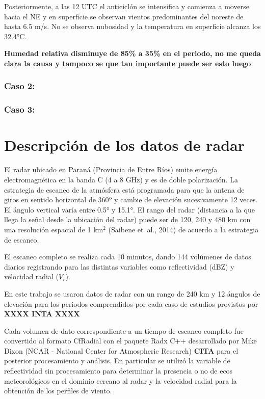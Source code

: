 \documentclass[12pt,spanish,oneside]{book}
\begin{document}
Posteriormente, a las 12 UTC el anticiclón se intensifica y comienza a
moverse hacia el NE y en superficie se observan vientos predominantes
del noreste de hasta 6.5 m/s. No se observa nubosidad y la temperatura
en superficie alcanza los 32.4°C.

\textbf{Humedad relativa disminuye de 85\% a 35\% en el periodo, no me
queda clara la causa y tampoco se que tan importante puede ser esto
luego}

\subsubsection{Caso 2:}\label{caso-2}

\subsubsection{Caso 3:}\label{caso-3}

\section{Descripción de los datos de
radar}\label{descripcion-de-los-datos-de-radar}

El radar ubicado en Paraná (Provincia de Entre Ríos) emite energía
electromagnética en la banda C (4 a 8 GHz) y es de doble polarización.
La estrategia de escaneo de la atmósfera está programada para que la
antena de giros en sentido horizontal de 360º y cambie de elevación
sucesivamente 12 veces. El ángulo vertical varía entre 0.5° y 15.1°. El
rango del radar (distancia a la que llega la señal desde la ubicación
del radar) puede ser de 120, 240 y 480 km con una resolución espacial de
1 \(\mathrm{km^2}\) (Saibene et~al., 2014) de acuerdo a la estrategia de
escaneo.

El escaneo completo se realiza cada 10 minutos, dando 144 volúmenes de
datos diarios registrando para las distintas variables como
reflectividad (dBZ) y velocidad radial (\(V_r\)).

En este trabajo se usaron datos de radar con un rango de 240 km y 12
ángulos de elevación para los periodos comprendidos por cada caso de
estudios provistos por \textbf{XXXX INTA XXXX}

Cada volumen de dato correspondiente a un tiempo de escaneo completo fue
convertido al formato CfRadial con el paquete Radx C++ desarrollado por
Mike Dixon (NCAR - National Center for Atmospheric Research)
\textbf{CITA} para el posterior procesamiento y análisis. En particular
se utilizó la variable de reflectividad sin procesamiento para
determinar la presencia o no de ecos meteorológicos en el dominio
cercano al radar y la velocidad radial para la obtención de los perfiles
de viento.
\end{document}

